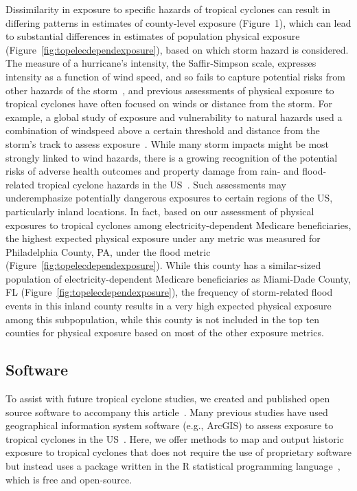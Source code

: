 Dissimilarity in exposure to specific hazards of tropical cyclones can result
in differing patterns in estimates of county-level exposure
(Figure~1), which can lead to substantial differences
in estimates of population physical exposure
(Figure~\ref{fig:topelecdependexposure}), based on which storm hazard is
considered. The measure of a hurricane's intensity, the Saffir-Simpson scale,
expresses intensity as a function of wind speed, and so fails to capture
potential risks from other hazards of the storm~\parencite{smith2009}, and
previous assessments of physical exposure to tropical cyclones have often
focused on winds or distance from the storm. For example, a global study of
exposure and vulnerability to natural hazards used a combination of windspeed
above a certain threshold and distance from the storm's track to assess
exposure~\parencite{peduzzi2009assessing}. While many storm impacts might be
most strongly linked to wind hazards, there is a growing recognition of the
potential risks of adverse health outcomes and property damage from rain- and
flood-related tropical cyclone hazards in the \ac{US}~\parencite{smith2009}.
Such assessments may underemphasize potentially dangerous exposures to certain
regions of the \ac{US}, particularly inland locations. In fact, based on our
assessment of physical exposures to tropical cyclones among
electricity-dependent Medicare beneficiaries, the highest expected physical
exposure under any metric was measured for Philadelphia County, PA, under the
flood metric (Figure~\ref{fig:topelecdependexposure}).  While this county has a
similar-sized population of electricity-dependent Medicare beneficiaries as
Miami-Dade County, FL (Figure~\ref{fig:topelecdependexposure}), the frequency
of storm-related flood events in this inland county results in a very high
expected physical exposure among this subpopulation, while this county is not
included in the top ten counties for physical exposure based on most of the
other exposure metrics.

\subsection*{Software}

To assist with future tropical cyclone studies, we created and published open
source software to accompany this article~\parencite{hurricaneexposuredata,
hurricaneexposure}. Many previous studies have used geographical
information system software (e.g., ArcGIS) to assess exposure to tropical
cyclones in the \ac{US}~\parencite{grabich2016, zandbergen2009, czajkowski2011,
kruk2010}. Here, we offer methods to map and output historic exposure to
tropical cyclones that does not require the use of proprietary software but
instead uses a package written in the R statistical programming
language~\parencite{R}, which is free and open-source.

